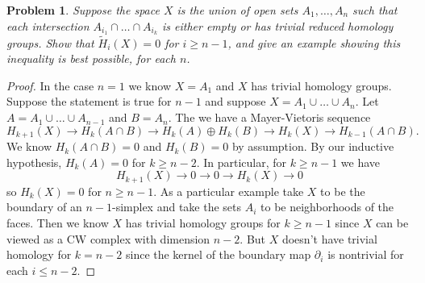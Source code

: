 \documentclass{article}
\newtheorem{problem}{Problem}
\begin{document}
\begin{problem}
Suppose the space $X$ is the union of open sets $A_1, \dots , A_n$ such that each intersection $A_{i_1} \cap \dots \cap A_{i_k}$ is either empty or has trivial reduced homology groups. Show that $\widetilde{H}_i(X) = 0$ for $i \geq n-1$, and give an example showing this inequality is best possible, for each $n$.
\end{problem}
\begin{proof}
In the case $n = 1$ we know $X = A_1$ and $X$ has trivial homology groups. Suppose the statement is true for $n - 1$ and suppose $X = A_1 \cup \dots \cup A_n$. Let $A = A_1 \cup \dots \cup A_{n-1}$ and $B = A_n$. The we have a Mayer-Vietoris sequence
\[
H_{k+1}(X) \to H_k(A \cap B) \to H_k(A) \oplus H_k(B) \to H_k(X) \to H_{k-1}(A \cap B).
\]
We know $H_k(A \cap B) = 0$ and $H_k(B) = 0$ by assumption. By our inductive hypothesis, $H_k(A) = 0$ for $k \geq n-2$. In particular, for $k \geq n-1$ we have
\[
H_{k+1}(X) \to 0 \to 0 \to H_k(X) \to 0
\]
so $H_k(X) = 0$ for $n \geq n-1$. As a particular example take $X$ to be the boundary of an $n-1$-simplex and take the sets $A_i$ to be neighborhoods of the faces. Then we know $X$ has trivial homology groups for $k \geq n-1$ since $X$ can be viewed as a CW complex with dimension $n-2$. But $X$ doesn't have trivial homology for $k = n-2$ since the kernel of the boundary map $\partial_i$ is nontrivial for each $i \leq n-2$.
\end{proof}
\end{document}
